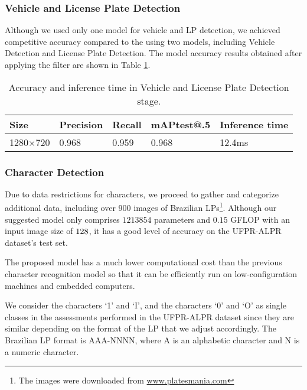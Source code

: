 \documentclass[conference]{IEEEtran}
\begin{document}
\subsubsection{Vehicle and License Plate Detection}
Although we used only one model for vehicle and LP detection, we achieved competitive accuracy compared to the \cite{layout} using two models, including Vehicle Detection and License Plate Detection. The model accuracy results obtained after applying the filter are shown in Table \ref{table2}.
\begin{table}[h!]
  \begin{center}
    \centering
    \caption{Accuracy and inference time in Vehicle and License Plate Detection stage.}
    \label{tab:table2}
    
\begin{tabular}{|p{11mm} | p{11mm} | p{8mm} | p{12mm} | p{11mm}|}
    \hline
      \textbf{Size} & \textbf{Precision} & \textbf{Recall}& \textbf{mAP\newline test@.5}&  \textbf{Inference time}\\
      \hline
      1280$\times$720 & 0.968  & 0.959 & 0.968 & 12.4ms\\
      \hline
    \end{tabular}
    \label{table2}
  \end{center}
\end{table}


\subsubsection{Character Detection}
Due to data restrictions for characters, we proceed to gather and categorize additional data, including over 900 images of Brazilian LPs\footnote{The images were downloaded from \url{www.platesmania.com}}. Although our suggested model only comprises $1213854$ parameters and $0.15$ GFLOP with an input image size of $128\time128$, it has a good level of accuracy on the UFPR-ALPR dataset's test set.

The proposed model has a much lower computational cost than the previous character recognition model \cite{layout} \cite{ufpr} so that it can be efficiently run on low-configuration machines and embedded computers.

We consider the characters `1' and `I', and the characters `0' and `O' as single classes in the assessments performed in the UFPR-ALPR dataset since they are similar depending on the format of the LP that we adjust accordingly. The Brazilian LP format is AAA-NNNN, where A is an alphabetic character and N is a numeric character.
\end{document}
